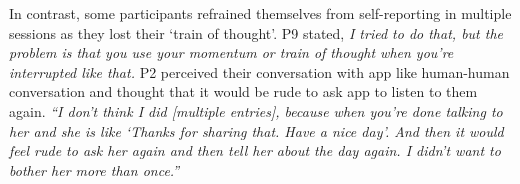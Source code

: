         In contrast, some participants refrained themselves from self-reporting in multiple sessions as they lost their `train of thought'. P9 stated,
                \textit{
                I tried to do that, but the problem is that you use your momentum or train of thought when you're interrupted like that.
                }
        P2 perceived their conversation with \acl{app} like human-human conversation and thought that it would be rude to ask \acl{app} to listen to them again.
                \textit{
                ``I don't think I did [multiple entries], because when you're done talking to her and she is like `Thanks for sharing that. Have a nice day'. And then it would feel rude to ask her again and then tell her about the day again. I didn't want to bother her more than once.''
                }
            
